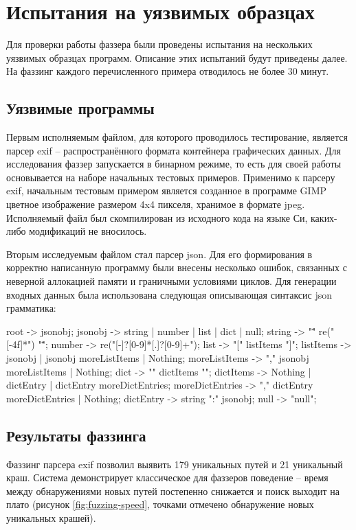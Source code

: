 \section{Испытания на уязвимых образцах}

Для проверки работы фаззера были проведены испытания на нескольких уязвимых образцах программ. Описание этих испытаний будут приведены далее. На фаззинг каждого перечисленного примера отводилось не более 30 минут.

\subsection{Уязвимые программы}

Первым исполняемым файлом, для которого проводилось тестирование, является парсер exif -- распространённого формата контейнера графических данных. Для исследования фаззер запускается в бинарном режиме, то есть для своей работы основывается на наборе начальных тестовых примеров. Применимо к парсеру exif, начальным тестовым примером является созданное в программе GIMP цветное изображение размером 4x4 пикселя, хранимое в формате jpeg. Исполняемый файл был скомпилирован из исходного кода на языке Си, каких-либо модификаций не вносилось.

Вторым исследуемым файлом стал парсер json. Для его формирования в корректно написанную программу были внесены несколько ошибок, связанных с неверной аллокацией памяти и граничными условиями циклов. Для генерации входных данных была использована следующая описывающая синтаксис json грамматика:

\begin{code}
root -> jsonobj;
jsonobj -> string 
    | number 
    | list 
    | dict 
    | null;
string -> "\"" re("[-\x4f]*") "\"";
number -> re("[-]?[0-9]*[.]?[0-9]+");
list -> "[" listItems "]";
listItems -> jsonobj 
    | jsonobj moreListItems 
    | Nothing;
moreListItems -> "," jsonobj moreListItems 
    | Nothing;
dict -> "{" dictItems "}";
dictItems -> Nothing 
    | dictEntry 
    | dictEntry moreDictEntries;
moreDictEntries -> "," dictEntry moreDictEntries 
    | Nothing;
dictEntry -> string ":" jsonobj;
null -> "null";
\end{code}

\subsection{Результаты фаззинга}

Фаззинг парсера exif позволил выявить 179 уникальных путей и 21 уникальный краш. Система демонстрирует классическое для фаззеров поведение -- время между обнаружениями новых путей постепенно снижается и поиск выходит на плато (рисунок \ref{fig:fuzzing-speed}, точками отмечено обнаружение новых уникальных крашей).

